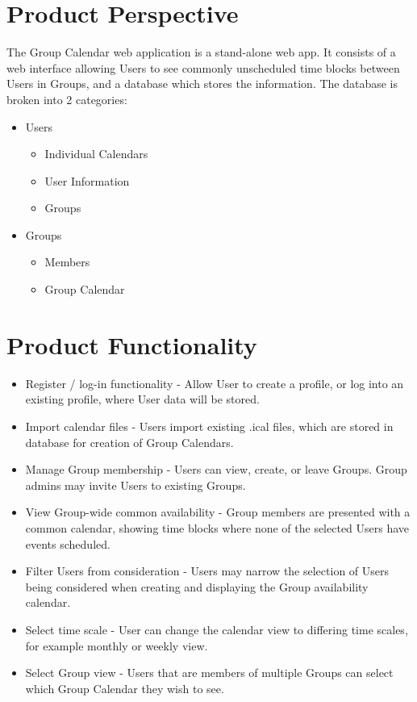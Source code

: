 \documentclass{scrreprt}
\begin{document}
\section{Product Perspective}
The Group Calendar web application is a stand-alone web app. It consists of a
web interface allowing Users to see commonly unscheduled time blocks between
Users in Groups, and a database which stores the information. The database is
broken into 2 categories:
\begin{itemize}
\item Users
	\begin{itemize}
	\item Individual Calendars
	\item User Information
	\item Groups
	\end{itemize}
\item Groups
	\begin{itemize}
	\item Members
	\item Group Calendar
	\end{itemize}
\end{itemize}

\section{Product Functionality}
\begin{itemize}
\item Register / log-in functionality - Allow User to create a profile, or log
into an existing profile, where User data will be stored.
\item Import calendar files - Users import existing .ical files, which are
stored in database for creation of Group Calendars.
\item Manage Group membership - Users can view, create, or leave Groups. Group
admins may invite Users to existing Groups.
\item View Group-wide common availability - Group members are presented with a
common calendar, showing time blocks where none of the selected Users have
events scheduled.
\item Filter Users from consideration - Users may narrow the selection of Users
being considered when creating and displaying the Group availability calendar.
\item Select time scale - User can change the calendar view to differing time
scales, for example monthly or weekly view.
\item Select Group view - Users that are members of multiple Groups can select
which Group Calendar they wish to see.
\end{itemize}
\end{document}

